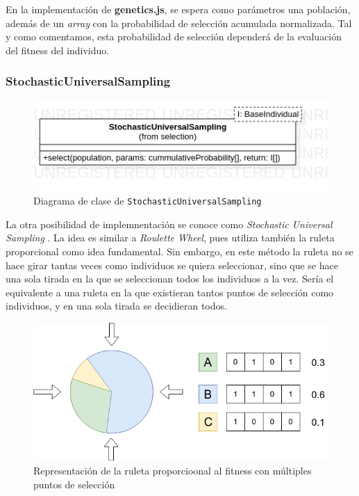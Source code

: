En la implementación de \textbf{genetics.js}, se espera como parámetros una población, además de un \textit{array} con la probabilidad de selección acumulada normalizada. Tal y como comentamos, esta probabilidad de selección dependerá de la evaluación del fitness del individuo.

\subsubsection{StochasticUniversalSampling}

\begin{figure}[ht]
    \centering
    \includegraphics[scale=0.6]{mem/images/cap-4/4.2.5(Selection)/SUS.png}
    \caption{Diagrama de clase de \texttt{StochasticUniversalSampling}}
    \label{fig:generator-uml}
\end{figure}


La otra posibilidad de implemnentación se conoce como \textit{Stochastic Universal Sampling} \cite{baker1987reducing}. La idea es similar a \textit{Roulette Wheel}, pues utiliza también la ruleta proporcional como idea fundamental. Sin embargo, en este método la ruleta no se hace girar tantas veces como individuos se quiera seleccionar, sino que se hace una sola tirada en la que se seleccionan todos los individuos a la vez. Sería el equivalente a una ruleta en la que existieran tantos puntos de selección como individuos, y en una sola tirada se decidieran todos. \\

\begin{figure}[ht]
    \centering
    \includegraphics[scale=0.5]{mem/images/cap-4/4.2.5(Selection)/SUS-1.png}
    \caption{Representación de la ruleta proporcioonal al fitness con múltiples puntos de selección}
    \label{fig:roulette-wheel-example}
\end{figure}

